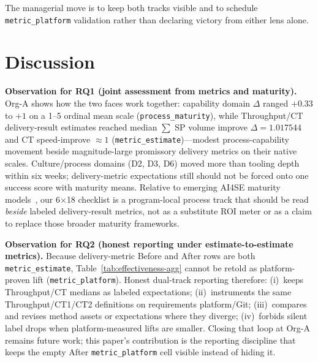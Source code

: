 \documentclass[10pt,conference]{IEEEtran}
\begin{document}
The managerial move is to keep both tracks visible and to schedule \texttt{metric\_platform} validation rather than declaring victory from either lens alone.

\section{Discussion}
\label{sec:discussion}

\textbf{Observation for RQ1 (joint assessment from metrics and maturity).}
Org-A shows how the two faces work together: capability domain $\Delta$ ranged $+0.33$ to $+1$ on a 1--5 ordinal mean scale (\texttt{process\_maturity}), while Throughput/CT delivery-result estimates reached median $\sum$ SP volume improve $\Delta=1.017544$ and CT speed-improve $\approx 1$ (\texttt{metric\_estimate})---modest process-capability movement beside magnitude-large promissory delivery metrics on their native scales.
Culture/process domains (D2, D3, D6) moved more than tooling depth within six weeks; delivery-metric expectations still should not be forced onto one success score with maturity means.
Relative to emerging AI4SE maturity models~\cite{Tereci2026AASD,Garousi2025AI4SEMM,Anderson2026ACMM}, our 6$\times$18 checklist is a program-local process track that should be read \emph{beside} labeled delivery-result metrics, not as a substitute ROI meter or as a claim to replace those broader maturity frameworks.

\textbf{Observation for RQ2 (honest reporting under estimate-to-estimate metrics).}
Because delivery-metric Before and After rows are both \texttt{metric\_estimate}, Table~\ref{tab:effectiveness-agg} cannot be retold as platform-proven lift (\texttt{metric\_platform}).
Honest dual-track reporting therefore: (i)~keeps Throughput/CT medians as labeled expectations; (ii)~instruments the same Throughput/CT1/CT2 definitions on requirements platform/Git; (iii)~compares and revises method assets or expectations where they diverge; (iv)~forbids silent label drops when platform-measured lifts are smaller.
Closing that loop at Org-A remains future work; this paper's contribution is the reporting discipline that keeps the empty After \texttt{metric\_platform} cell visible instead of hiding it.
\end{document}

